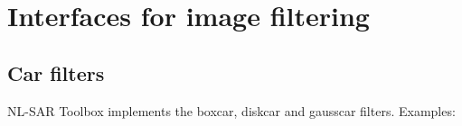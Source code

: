 \documentclass[10pt,french,english,a4paper]{article}
\begin{document}






\section{Interfaces for image filtering}

\subsection{Car filters}

NL-SAR Toolbox implements the boxcar, diskcar and gausscar filters. Examples:
\end{document}
